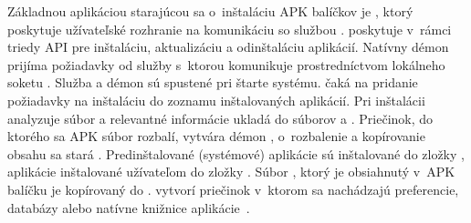 \noindent Základnou aplikáciou starajúcou sa o~inštaláciu APK balíčkov je , ktorý poskytuje užívateľské rozhranie na komunikáciu so službou .   poskytuje v~rámci triedy  API pre inštaláciu, aktualizáciu a odinštaláciu aplikácií. Natívny démon  prijíma požiadavky od služby  s~ktorou komunikuje prostredníctvom lokálneho soketu . Služba  a démon  sú spustené pri štarte systému.  čaká na pridanie požiadavky na inštaláciu do zoznamu inštalovaných aplikácií. Pri inštalácii analyzuje súbor  a relevantné informácie ukladá do súborov  a . Priečinok, do ktorého sa APK súbor rozbalí, vytvára démon , o~rozbalenie a kopírovanie obsahu sa stará . Predinštalované (systémové) aplikácie sú inštalované do zložky , aplikácie inštalované užívateľom do zložky . Súbor , ktorý je obsiahnutý v~APK balíčku je kopírovaný do .  vytvorí priečinok  v~ktorom sa nachádzajú preferencie, databázy alebo natívne knižnice aplikácie~\cite{Parmar2013}.